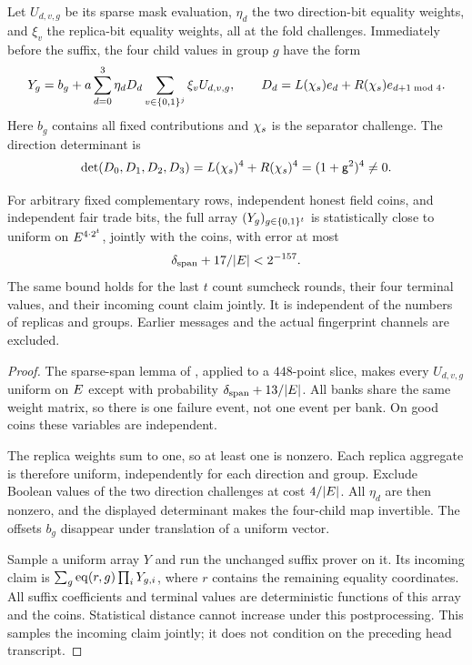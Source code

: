 Let $U_{d,v,g}$ be its sparse mask evaluation, $\eta_d$ the two direction-bit equality weights, and $\xi_v$ the replica-bit equality weights, all at the fold challenges. Immediately before the suffix, the four child values in group $g$ have the form
\[
 Y_g=b_g+
 a\sum_{d=0}^3\eta_d D_d\sum_{v\in\{0,1\}^{j}}\xi_vU_{d,v,g},
 \qquad D_d=L(\chi_s)e_{d}+R(\chi_s)e_{d+1\bmod4}.
\]
Here $b_g$ contains all fixed contributions and $\chi_s$ is the separator challenge. The direction determinant is
\[
 \det(D_0,D_1,D_2,D_3)=L(\chi_s)^4+R(\chi_s)^4=(1+\mathsf{g}^2)^4\ne0.
\]

\begin{proposition}
For arbitrary fixed complementary rows, independent honest field coins, and independent fair trade bits, the full array $(Y_g)_{g\in\{0,1\}^{t}}$ is statistically close to uniform on $E^{4\cdot2^t}$, jointly with the coins, with error at most
\[
 \delta_{\mathrm{span}}+17/|E|<2^{-157}.
\]
The same bound holds for the last $t$ count sumcheck rounds, their four terminal values, and their incoming count claim jointly. It is independent of the numbers of replicas and groups. Earlier messages and the actual fingerprint channels are excluded.
\end{proposition}
\begin{proof}
The sparse-span lemma of , applied to a $448$-point slice, makes every $U_{d,v,g}$ uniform on $E$ except with probability $\delta_{\mathrm{span}}+13/|E|$. All banks share the same weight matrix, so there is one failure event, not one event per bank. On good coins these variables are independent.

The replica weights sum to one, so at least one is nonzero. Each replica aggregate is therefore uniform, independently for each direction and group. Exclude Boolean values of the two direction challenges at cost $4/|E|$. All $\eta_d$ are then nonzero, and the displayed determinant makes the four-child map invertible. The offsets $b_g$ disappear under translation of a uniform vector.

Sample a uniform array $Y$ and run the unchanged suffix prover on it. Its incoming claim is $\sum_g\operatorname{eq}(r,g)\prod_iY_{g,i}$, where $r$ contains the remaining equality coordinates. All suffix coefficients and terminal values are deterministic functions of this array and the coins. Statistical distance cannot increase under this postprocessing. This samples the incoming claim jointly; it does not condition on the preceding head transcript.
\end{proof}

